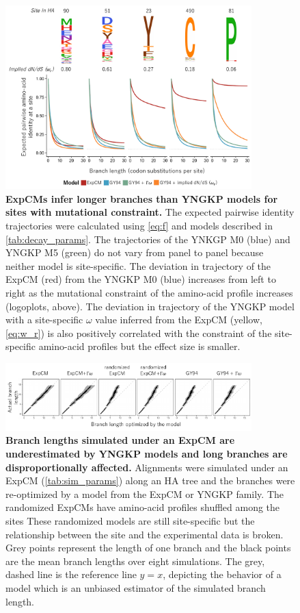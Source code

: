 \documentclass[11pt]{article}
\begin{document}
\begin{figure}
\centerline{\includegraphics[width=0.85\textwidth]{figures/decay}}
\caption{\label{decay}
\textbf{ExpCMs infer longer branches than YNGKP models for sites with mutational constraint.}
The expected pairwise identity trajectories were calculated using \ref{eq:f} and models described in \ref{tab:decay_params}.
The trajectories of the YNKGP M0 (blue) and YNGKP M5 (green) do not vary from panel to panel because neither model is site-specific. 
The deviation in trajectory of the ExpCM (red) from the YNGKP M0 (blue) increases from left to right as the mutational constraint of the amino-acid profile increases (logoplots, above). 
The deviation in trajectory of the YNGKP model with a site-specific $\omega$ value inferred from the ExpCM (yellow, \ref{eq:w_r}) is also positively correlated with the constraint of the site-specific amino-acid profiles but the effect size is smaller.  
}
\end{figure}

\begin{figure}
\centerline{\includegraphics[width=0.85\textwidth]{figures/simulations}}
\caption{\label{simulations}
\textbf{Branch lengths simulated under an ExpCM are underestimated by YNGKP models and long branches are disproportionally affected.} 
Alignments were simulated under an ExpCM (\ref{tab:sim_params}) along an HA tree and the branches were re-optimized by a model from the ExpCM or YNGKP family. 
The randomized ExpCMs have amino-acid profiles shuffled among the sites 
These randomized models are still site-specific but the relationship between the site and the experimental data is broken. 
Grey points represent the length of one branch and the black points are the mean branch lengths over eight simulations. 
The grey, dashed line is the reference line $y=x$, depicting the behavior of a model which is an unbiased estimator of the simulated branch length. 
}
\end{figure}
\end{document}
